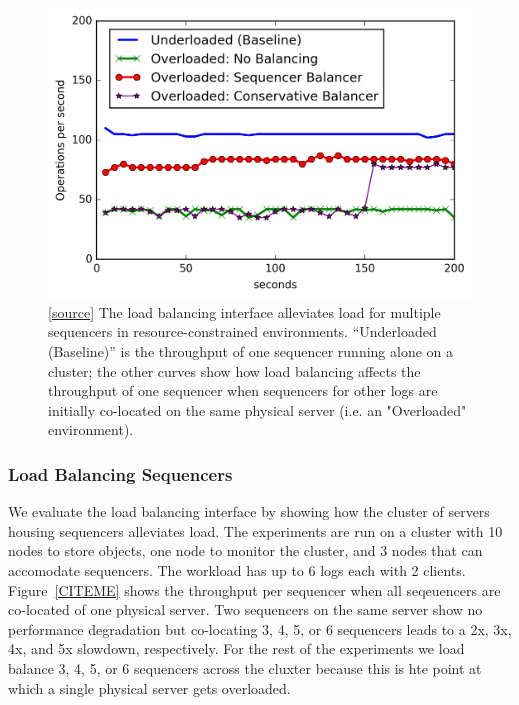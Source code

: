 \documentclass[preprint]{sigplanconf-eurosys}
\begin{document}
\begin{figure}[t!]
\centering
\includegraphics{figures/mantle-seq-thruput.png}
\caption{[\href{https://github.com/double-blind-submitter/osdi16}{source}] The
load balancing interface alleviates load for multiple sequencers in
resource-constrained environments.  ``Underloaded (Baseline)'' is the
throughput of one sequencer running alone on a cluster; the other curves show
how load balancing affects the throughput of one sequencer when sequencers for
other logs are initially co-located on the same physical server (i.e. an
"Overloaded" environment).}\label{fig:mantle-seq-thruput}
\end{figure}

\subsubsection{Load Balancing Sequencers}

We evaluate the load balancing interface by showing how the cluster of servers
housing sequencers alleviates load.  The experiments are run on a cluster with
10 nodes to store objects, one node to monitor the cluster, and 3 nodes that
can accomodate sequencers. The workload has up to 6 logs each with 2 clients.
Figure~\ref{CITEME} shows the throughput per sequencer when all seqeuencers are
co-located of one physical server. Two sequencers on the same server show no
performance degradation but co-locating 3, 4, 5, or 6 sequencers leads to a
2x, 3x, 4x, and 5x slowdown, respectively. For the rest of the experiments we
load balance 3, 4, 5, or 6 sequencers across the cluxter because this is hte
point at which a single physical server gets overloaded.
\end{document}

